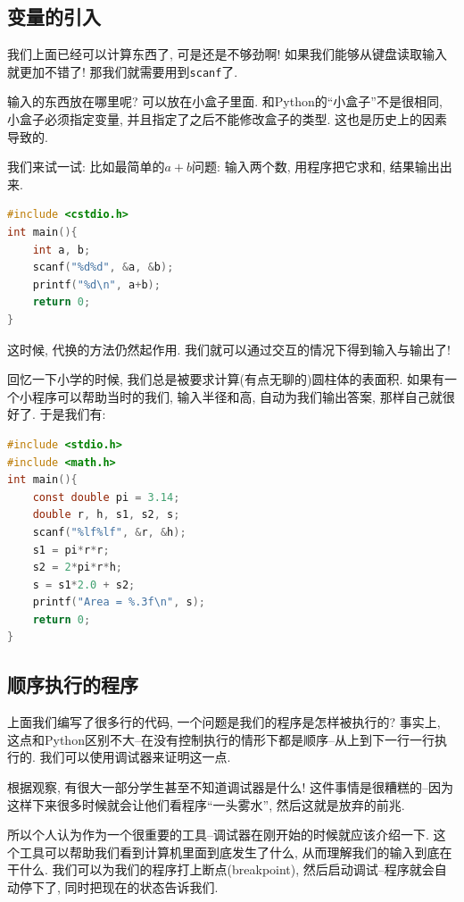 \subsection{变量的引入}

我们上面已经可以计算东西了, 可是还是不够劲啊! 如果我们能够从键盘读取输入就更加不错了! 那我们就需要用到\texttt{scanf}了. 

输入的东西放在哪里呢? 可以放在小盒子里面. 和Python的``小盒子''不是很相同, 小盒子必须指定变量, 并且指定了之后不能修改盒子的类型. 这也是历史上的因素导致的. 

我们来试一试: 比如最简单的$a+b$问题: 输入两个数, 用程序把它求和, 结果输出出来. 

\begin{lstlisting}[language=c]
#include <cstdio.h>
int main(){
	int a, b;
	scanf("%d%d", &a, &b);
	printf("%d\n", a+b);
	return 0;
}
\end{lstlisting} 

这时候, 代换的方法仍然起作用. 我们就可以通过交互的情况下得到输入与输出了! 

回忆一下小学的时候, 我们总是被要求计算(有点无聊的)圆柱体的表面积. 如果有一个小程序可以帮助当时的我们, 输入半径和高, 自动为我们输出答案, 那样自己就很好了. 于是我们有: 

\begin{lstlisting}[language=c]
#include <stdio.h>
#include <math.h>
int main(){
	const double pi = 3.14;
	double r, h, s1, s2, s;
	scanf("%lf%lf", &r, &h);
	s1 = pi*r*r;
	s2 = 2*pi*r*h;
	s = s1*2.0 + s2;
	printf("Area = %.3f\n", s);
	return 0;
}	
\end{lstlisting}

\subsection{顺序执行的程序}

上面我们编写了很多行的代码, 一个问题是我们的程序是怎样被执行的? 事实上, 这点和Python区别不大--在没有控制执行的情形下都是顺序--从上到下一行一行执行的. 我们可以使用调试器来证明这一点. 

\begin{tool}
	根据观察, 有很大一部分学生甚至不知道调试器是什么! 这件事情是很糟糕的--因为这样下来很多时候就会让他们看程序``一头雾水'', 然后这就是放弃的前兆. 

	所以个人认为作为一个很重要的工具--调试器在刚开始的时候就应该介绍一下. 这个工具可以帮助我们看到计算机里面到底发生了什么, 从而理解我们的输入到底在干什么. 我们可以为我们的程序打上断点(breakpoint), 然后启动调试--程序就会自动停下了, 同时把现在的状态告诉我们. 
\end{tool}



